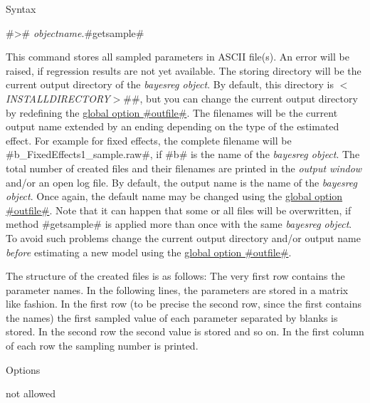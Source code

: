 \begin{stanza}{Syntax}

#># {\em objectname}.#getsample#

This command stores all sampled parameters in ASCII file(s). An
error will be raised, if regression results are not yet available.
The storing directory will be the current output directory of the
{\em bayesreg object}. By default, this directory is {\em
$<$INSTALLDIRECTORY$>$}#\output#, but you can change the current
output directory by redefining the \hyperref[bayesregglobopt]{global
option #outfile#}. The filenames will be the current output name
extended by an ending depending on the type of the estimated effect.
For example for fixed effects, the complete filename will be
#b_FixedEffects1_sample.raw#, if #b# is the name of the {\em
bayesreg object}. The total number of created files and their
filenames are printed in the {\em output window} and/or an open log
file. By default, the output name is the name of the {\em bayesreg
object}. Once again, the default name may be changed using the
\hyperref[bayesregglobopt]{global option #outfile#}. Note that it
can happen that some or all files will be overwritten, if method
#getsample# is applied more than once with the same {\em bayesreg
object}. To avoid such problems change the current output directory
and/or output name {\em before} estimating a new model using the
\hyperref[bayesregglobopt]{global option #outfile#}.

The structure of the created files is as follows: The very first
row contains the parameter names. In the following lines, the
parameters are stored in a matrix like fashion. In the first row
(to be precise the second row, since the first contains the names)
the first sampled value of each parameter separated by blanks is
stored. In the second row the second value is stored and so on. In
the first column of each row the sampling number is printed.
\end{stanza}

\begin{stanza}{Options}

not allowed

\end{stanza}

